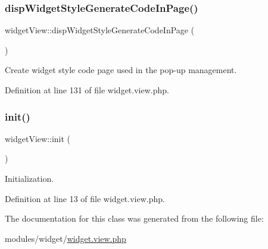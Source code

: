 \subsubsection{\texorpdfstring{disp\+Widget\+Style\+Generate\+Code\+In\+Page()}{dispWidgetStyleGenerateCodeInPage()}}
{\footnotesize\ttfamily widget\+View\+::disp\+Widget\+Style\+Generate\+Code\+In\+Page (\begin{DoxyParamCaption}{ }\end{DoxyParamCaption})}



Create widget style code page used in the pop-\/up management. 



Definition at line 131 of file widget.\+view.\+php.

\mbox{\label{classwidgetView_aae33eb1e6769bef674ec184703a6bac2}} 
\subsubsection{\texorpdfstring{init()}{init()}}
{\footnotesize\ttfamily widget\+View\+::init (\begin{DoxyParamCaption}{ }\end{DoxyParamCaption})}



Initialization. 



Definition at line 13 of file widget.\+view.\+php.



The documentation for this class was generated from the following file\+:\begin{DoxyCompactItemize}
\item 
modules/widget/\hyperlink{widget_8view_8php}{widget.\+view.\+php}\end{DoxyCompactItemize}
